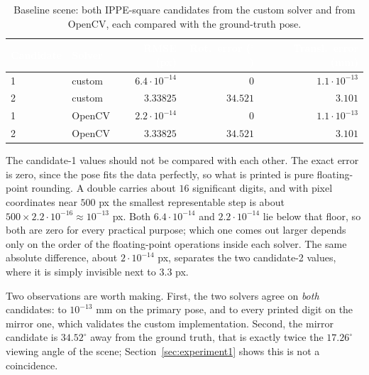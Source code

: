 \documentclass[11pt,a4paper]{article}
\theoremstyle{definition}
\theoremstyle{plain}
\theoremstyle{remark}
\newcommand{\thcell}[1]{\textcolor{white}{\textbf{#1}}}
\begin{document}
\begin{table}[h!]
\centering\small
\begin{tabularx}{\linewidth}{@{}YYrrr@{}}
\toprule
{}\thcell{Candidate}&\thcell{Solver}&\thcell{RMSE (px)}&\thcell{Rot.\ error ($^\circ$)}&\thcell{Transl.\ error (mm)}\\
&custom&$6.4\cdot10^{-14}$&$0$&$1.1\cdot10^{-13}$\\
 2&custom&$3.33825$&$34.521$&$3.101$\\
1&OpenCV&$2.2\cdot10^{-14}$&$0$&$1.1\cdot10^{-13}$\\
 2&OpenCV&$3.33825$&$34.521$&$3.101$\\
\bottomrule
\end{tabularx}
\caption{Baseline scene: both IPPE-square candidates from the custom solver and
from OpenCV, each compared with the ground-truth pose.}
\label{tab:baseline}
\end{table}

The candidate-1 values should not be compared with each other. The exact error
is zero, since the pose fits the data perfectly, so what is printed is pure
floating-point rounding. A double carries about $16$ significant digits, and
with pixel coordinates near $500$ px the smallest representable step is about
$500 \times 2.2\cdot10^{-16} \approx 10^{-13}$ px. Both $6.4\cdot10^{-14}$ and
$2.2\cdot10^{-14}$ lie below that floor, so both are zero for every practical
purpose; which one comes out larger depends only on the order of the
floating-point operations inside each solver. The same absolute difference,
about $2\cdot10^{-14}$ px, separates the two candidate-2 values, where it is
simply invisible next to $3.3$ px.

Two observations are worth making. First, the two solvers agree on \emph{both}
candidates: to $10^{-13}$ mm on the primary pose, and to every printed digit on
the mirror one, which validates the custom implementation. Second, the
mirror candidate is $34.52^\circ$ away from the ground truth, that is exactly
twice the $17.26^\circ$ viewing angle of the scene; Section~\ref{sec:experiment1}
shows this is not a coincidence.
\end{document}
